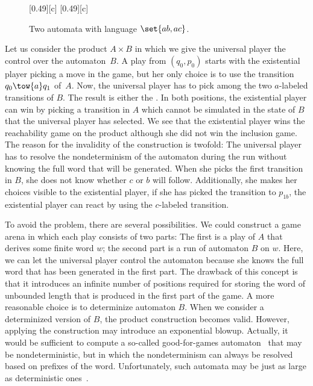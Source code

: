 \documentclass[../../diss.tex]{subfiles}
\begin{document}
\begin{figure}[t]
    [0.49\textwidth][c]%
    {%
    }%
    [0.49\textwidth][c]%
    {%
    }%
    \caption{Two automata with language $\set{ab,ac}$.}%
    \label{Figure:GamesNotBisimilar}
\end{figure}

Let us consider the product $A \times B$ in which we give the universal player the control over the automaton~$B$.
A play from $(q_0,p_0)$ starts with the existential player picking a move in the game, but her only choice is to use the transition $q_0 \tow{a} q_1$ of~$A$.
Now, the universal player has to pick among the two $a$-labeled transitions of $B$.
The result is either the .
In both positions, the existential player can win by picking a transition in $A$ which cannot be simulated in the state of $B$ that the universal player has selected.
We see that the existential player wins the reachability game on the product although she did not win the inclusion game.
The reason for the invalidity of the construction is twofold:
The universal player has to resolve the nondeterminism of the automaton during the run without knowing the full word that will be generated.
When she picks the first transition in $B$, she does not know whether $c$ or $b$ will follow.
Additionally, she makes her choices visible to the existential player, \eg if she has picked the transition to $p_{1b}$, the existential player can react by using the $c$-labeled transition.

To avoid the problem, there are several possibilities.
We could construct a game arena in which each play consists of two parts: The first is a play of $A$ that derives some finite word $w$; the second part is a run of automaton $B$ on $w$.
Here, we can let the universal player control the automaton because she knows the full word that has been generated in the first part.
The drawback of this concept is that it introduces an infinite number of positions required for storing the word of unbounded length that is produced in the first part of the game.
A more reasonable choice is to determinize automaton $B$.
When we consider a determinized version of $B$, the product construction becomes valid.
However, applying the construction may introduce an exponential blowup.
Actually, it would be sufficient to compute a so-called good-for-games automaton~\cite{HenzingerP06} that may be nondeterministic, but in which the nondeterminism can always be resolved based on prefixes of the word.
Unfortunately, such automata may be just as large as deterministic ones~\cite{KuperbergS15}.
\end{document}
